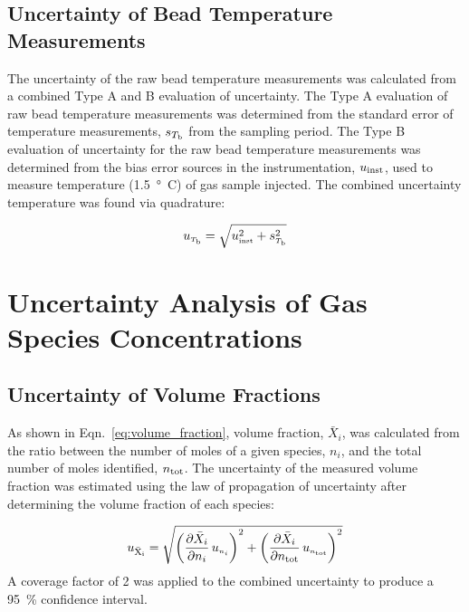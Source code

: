 \documentclass[12pt]{article}
\begin{document}
\subsection{Uncertainty of Bead Temperature Measurements}
\label{ssec:Uncertain_Bead_Temp_Measurements}
The uncertainty of the raw bead temperature measurements was calculated from a combined Type A and B evaluation of uncertainty. The Type A evaluation of raw bead temperature measurements was determined from the standard error of temperature measurements, $s_{T_{\rm b}}$ from the sampling period. The Type B evaluation of uncertainty for the raw bead temperature measurements was determined from the bias error sources in the instrumentation, $u_{\rm inst}$, used to measure temperature (\SI{1.5}{\degree C}) of gas sample injected. The combined uncertainty temperature was found via quadrature:

\begin{equation}
\label{eq:temp_uncertainty}
u_{\scriptscriptstyle T_{\rm b}} = \sqrt{ u_{\rm \scriptscriptstyle inst}^2 + s_{\scriptscriptstyle T_{\rm b}}^2}
\end{equation}
\pagebreak

\section{Uncertainty Analysis of Gas Species Concentrations} \label{sec:UncertaintyGasSpecies}

\subsection{Uncertainty of Volume Fractions} \label{sec:UncertaintyMoleFrac}
As shown in Eqn.~\ref{eq:volume_fraction}, volume fraction, $\bar{X}_{i}$, was calculated from the ratio between the number of moles of a given species, $n_{i}$, and the total number of moles identified, $n_{\rm tot}$. The uncertainty of the measured volume fraction was estimated using the law of propagation of uncertainty after determining the volume fraction of each species:

\begin{equation}
\label{eq:Volume_Frac_Uncertainty}
u_\mathrm{\bar{X}_{i}} = \sqrt{{\left( \frac{\partial \bar{X}_{i}}{\partial n_{i}}\,u_{\scriptscriptstyle n_{i}} \right)}^2+{\left(\frac{\partial \bar{X}_{i}}{\partial n_{\rm tot}}\,u_{\scriptscriptstyle n_{\rm tot}}\right)}^2}
\end{equation}
A coverage factor of 2 was applied to the combined uncertainty to produce a 95~\% confidence interval.
\end{document}

